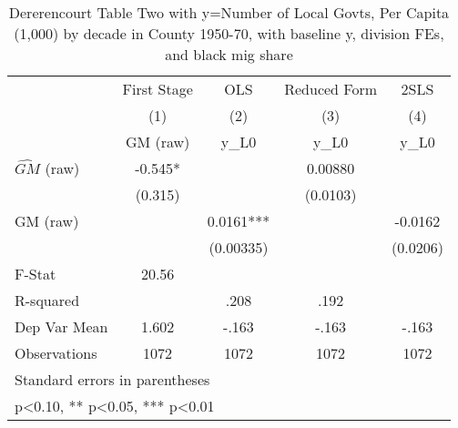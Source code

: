 \begin{table}[htbp]\centering
\def\sym#1{\ifmmode^{#1}\else\(^{#1}\)\fi}
\caption{Dererencourt Table Two with y=Number of Local Govts, Per Capita (1,000) by decade in County 1950-70, with baseline y, division FEs, and black mig share}
\begin{tabular}{l*{4}{c}}
\toprule
                    & First Stage   &         OLS   &Reduced Form   &        2SLS   \\
                    &\multicolumn{1}{c}{(1)}&\multicolumn{1}{c}{(2)}&\multicolumn{1}{c}{(3)}&\multicolumn{1}{c}{(4)}\\
                    &\multicolumn{1}{c}{GM  (raw)}&\multicolumn{1}{c}{y\_L0}&\multicolumn{1}{c}{y\_L0}&\multicolumn{1}{c}{y\_L0}\\
\midrule
$\hat{GM}$ (raw)    &      -0.545*  &               &     0.00880   &               \\
                    &     (0.315)   &               &    (0.0103)   &               \\
\addlinespace
GM  (raw)           &               &      0.0161***&               &     -0.0162   \\
                    &               &   (0.00335)   &               &    (0.0206)   \\
\midrule
F-Stat              &       20.56   &               &               &               \\
R-squared           &               &        .208   &        .192   &               \\
Dep Var Mean        &       1.602   &       -.163   &       -.163   &       -.163   \\
Observations        &        1072   &        1072   &        1072   &        1072   \\
\bottomrule
\multicolumn{5}{l}{\footnotesize Standard errors in parentheses}\\
\multicolumn{5}{l}{\footnotesize * p<0.10, ** p<0.05, *** p<0.01}\\
\end{tabular}
\end{table}
